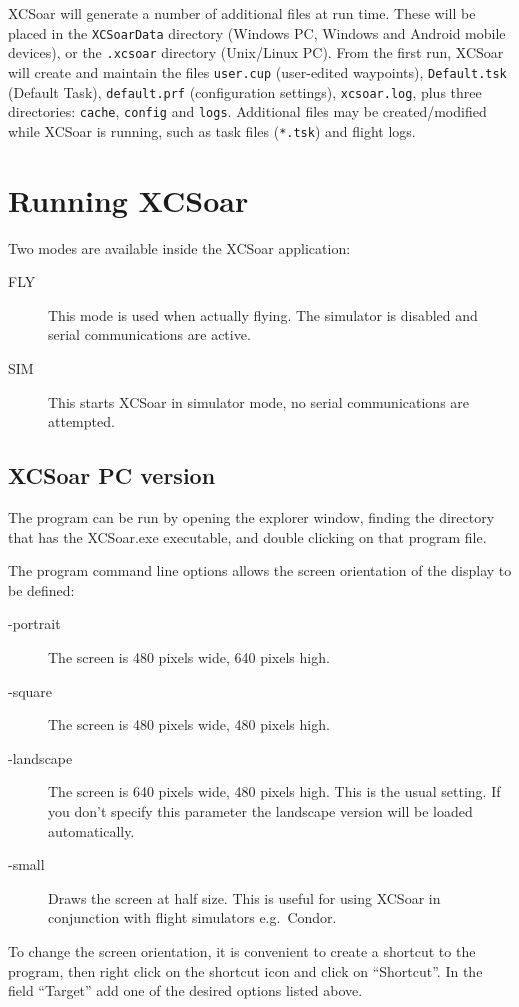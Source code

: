 XCSoar will generate a number of additional files at run time.  These
will be placed in the  \texttt{XCSoarData} directory (Windows PC, 
Windows and Android mobile devices), or the \texttt{.xcsoar} directory (Unix/Linux
PC).  From the first run, XCSoar will create and maintain the files
\texttt{user.cup} (user-edited waypoints),
\texttt{Default.tsk} (Default Task),  
\texttt{default.prf} 
(configuration settings),
\texttt{xcsoar.log}, 
plus three directories: \texttt{cache},
\texttt{config} and \texttt{logs}.  Additional files may be
created/modified while XCSoar is running, such as task files
(\texttt{*.tsk}) and flight logs.


\section{Running XCSoar}

Two modes are available inside the XCSoar application: 
\begin{description}
\item[FLY] This mode is used when actually flying.  The simulator is 
  disabled and serial communications are active. 
\item[SIM] This starts XCSoar in simulator mode, no serial communications
  are attempted.
\end{description}

\subsection*{XCSoar PC version}
The program can be run by opening the explorer window, finding the directory
that has the XCSoar.exe executable, and double clicking on that program file.

The program command line options allows the screen orientation of
the display to be defined:
\begin{description}
\item[-portrait] The screen is 480 pixels wide, 640 pixels high.
\item[-square] The screen is 480 pixels wide, 480 pixels high.
\item[-landscape] The screen is 640 pixels wide, 480 pixels high. This is the
usual setting. If you don't specify this parameter the landscape version will be
loaded automatically.
\item[-small] Draws the screen at half size.  This is useful for using XCSoar in
 conjunction with flight simulators e.g.\ Condor.
\end{description}
To change the screen orientation, it is convenient to create a shortcut to the
program, then right click on the shortcut icon and click on ``Shortcut''. 
In the field ``Target'' add one of the desired options listed above.

